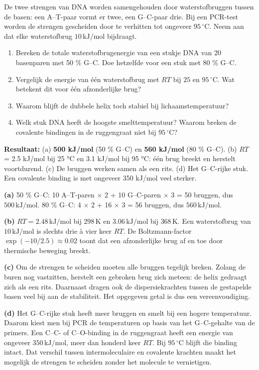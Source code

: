 \begin{oefening}
De twee strengen van DNA worden samengehouden door waterstofbruggen tussen de basen: een A--T-paar vormt er twee, een G--C-paar drie. Bij een PCR-test worden de strengen gescheiden door te verhitten tot ongeveer \(95\,^\circ\mathrm{C}\). Neem aan dat elke waterstofbrug \(10\,\mathrm{kJ/mol}\) bijdraagt.

\begin{enumerate}
\item[(a)]
  Bereken de totale waterstofbrugenergie van een stukje DNA van 20 basenparen met 50 \% G--C. Doe hetzelfde voor een stuk met 80 \% G--C.
\item[(b)]
  Vergelijk de energie van één waterstofbrug met \(RT\) bij \(25\) en \(95\,^\circ\mathrm{C}\). Wat betekent dit voor één afzonderlijke brug?
\item[(c)]
  Waarom blijft de dubbele helix toch stabiel bij lichaamstemperatuur?
\item[(d)]
  Welk stuk DNA heeft de hoogste smelttemperatuur? Waarom breken de covalente bindingen in de ruggengraat niet bij \(95\,^\circ\mathrm{C}\)?
\end{enumerate}
\end{oefening}
\begin{oplossing}
\textbf{Resultaat:} (a) \textbf{500 kJ/mol} (50 \% G--C) en \textbf{560 kJ/mol} (80 \% G--C). (b) \(RT\) = 2.5 kJ/mol bij 25 °C en 3.1 kJ/mol bij 95 °C: één brug breekt en herstelt voortdurend. (c) De bruggen werken samen als een rits. (d) Het G--C-rijke stuk. Een covalente binding is met ongeveer 350 kJ/mol veel sterker.

\textbf{(a)} 50 \% G--C: 10 A--T-paren \ensuremath{\times{}} 2 + 10 G--C-paren \ensuremath{\times{}} 3 = 50 bruggen, dus \(500\,\mathrm{kJ/mol}\). 80 \% G--C: 4 \ensuremath{\times{}} 2 + 16 \ensuremath{\times{}} 3 = 56 bruggen, dus \(560\,\mathrm{kJ/mol}\).

\textbf{(b)} \(RT = 2.48\,\mathrm{kJ/mol}\) bij \(298\,\mathrm{K}\) en \(3.06\,\mathrm{kJ/mol}\) bij \(368\,\mathrm{K}\). Een waterstofbrug van \(10\,\mathrm{kJ/mol}\) is slechts drie à vier keer \(RT\). De Boltzmann-factor \(\exp(-10/2.5) \approx 0.02\) toont dat een afzonderlijke brug af en toe door thermische beweging breekt.

\textbf{(c)} Om de strengen te scheiden moeten alle bruggen tegelijk breken. Zolang de buren nog vastzitten, herstelt een gebroken brug zich meteen: de helix gedraagt zich als een rits. Daarnaast dragen ook de dispersiekrachten tussen de gestapelde basen veel bij aan de stabiliteit. Het opgegeven getal is dus een vereenvoudiging.

\textbf{(d)} Het G--C-rijke stuk heeft meer bruggen en smelt bij een hogere temperatuur. Daarom kiest men bij PCR de temperaturen op basis van het G--C-gehalte van de primers. Een C--C- of C--O-binding in de ruggengraat heeft een energie van ongeveer \(350\,\mathrm{kJ/mol}\), meer dan honderd keer \(RT\). Bij \(95\,^\circ\mathrm{C}\) blijft die binding intact. Dat verschil tussen intermoleculaire en covalente krachten maakt het mogelijk de strengen te scheiden zonder het molecule te vernietigen.
\end{oplossing}

